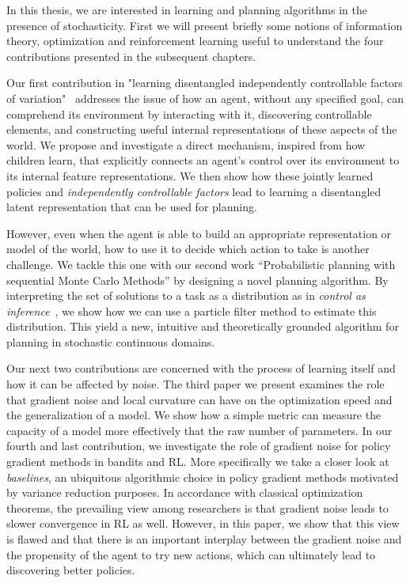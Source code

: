 In this thesis, we are interested in learning and planning algorithms in the presence of stochasticity. First we will present briefly some notions of information theory, optimization and reinforcement learning useful to understand the four contributions presented in the subsequent chapters.%

Our first contribution in "learning disentangled independently controllable factors of variation"~\citep{bengio2017independently, thomas2017independently, thomas2018disentangling} addresses the issue of how an agent, without any specified goal, can comprehend its environment by interacting with it, discovering controllable elements, and constructing useful internal representations of these aspects of the world. We propose and investigate a direct mechanism, inspired from how children learn, that explicitly connects an agent's control over its environment to its internal feature representations. We then show how these jointly learned policies and \emph{independently controllable factors} lead to learning a disentangled latent representation that can be used for planning. 

However, even when the agent is able to build an appropriate representation or model of the world, how to use it to decide which action to take is another challenge.
We tackle this one with our second work ``Probabilistic planning with sequential Monte Carlo Methods'' by designing a novel planning algorithm. By interpreting the set of solutions to a task as a distribution as in \textit{control as inference}~\citep{toussaint2006probabilistic, toussaint2009robot, levine2018reinforcement}, we show how we can use a particle filter method to estimate this distribution. This yield a new, intuitive and theoretically grounded algorithm for planning in stochastic continuous domains.

Our next two contributions are concerned with the process of learning itself and
how it can be affected by noise. The third paper we present examines the role
that gradient noise and local curvature can have on the optimization speed and
the generalization of a model. We show how a simple metric can measure the capacity of a model more effectively that the raw number of parameters.
In our fourth and last contribution, we investigate the role of gradient noise for policy gradient methods in bandits and RL. More specifically we take a closer look at \emph{baselines}, an ubiquitous algorithmic choice in policy gradient methods motivated by variance reduction purposes. In accordance with classical optimization theorems, the prevailing view among researchers is that gradient noise leads to slower convergence in RL as well. However, in this paper, we show that this view is flawed and that there is an important interplay between the gradient noise and the propensity of the agent to try new actions, which can ultimately lead to discovering better policies.



















